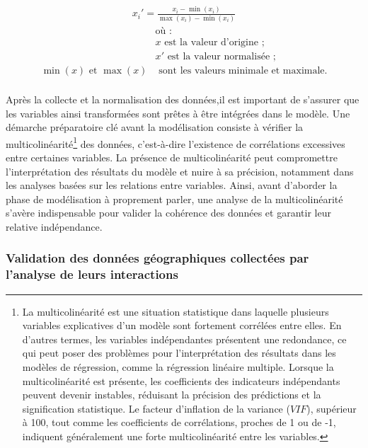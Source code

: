 \begin{refsegment}
\begin{equation}
\label{equation:normalisation}
\begin{aligned}
x_i' = \frac{x_i - \min(x_i)}{\max(x_i) - \min(x_i)}
\end{aligned}
\end{equation}
\begin{align*}
    &\text{où~:}\\
    &x \text{ est la valeur d'origine~;}\\
    &x' \text{ est la valeur normalisée~;}\\
    \min(x) \text{ et } \max(x) & \text{ sont les valeurs minimale et maximale.}\\
\end{align*}%

Après la collecte et la normalisation des données,il est important de s'assurer que les variables ainsi transformées sont prêtes à être intégrées dans le modèle. Une démarche préparatoire clé avant la modélisation consiste à vérifier la multicolinéarité\footnote{
    La multicolinéarité est une situation statistique dans laquelle plusieurs variables explicatives d'un modèle sont fortement corrélées entre elles. En d'autres termes, les variables indépendantes présentent une redondance, ce qui peut poser des problèmes pour l'interprétation des résultats dans les modèles de régression, comme la régression linéaire multiple. Lorsque la multicolinéarité est présente, les coefficients des indicateurs indépendants peuvent devenir instables, réduisant la précision des prédictions et la signification statistique. Le facteur d'inflation de la variance (\(VIF\)), supérieur à 100, tout comme les coefficients de corrélations, proches de 1 ou de -1, indiquent généralement une forte multicolinéarité entre les variables.
} des données, c'est-à-dire l'existence de corrélations excessives entre certaines variables. La présence de multicolinéarité peut compromettre l'interprétation des résultats du modèle et nuire à sa précision, notamment dans les analyses basées sur les relations entre variables. Ainsi, avant d'aborder la phase de modélisation à proprement parler, une analyse de la multicolinéarité s'avère indispensable pour valider la cohérence des données et garantir leur relative indépendance.%

\subsubsection*{Validation des données géographiques collectées par l'analyse de leurs interactions
    \label{chap6:methodologie-statistiques-validation}
    }


\end{refsegment}
